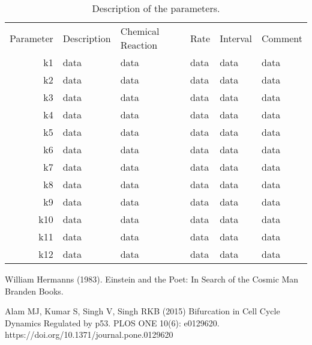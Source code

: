 \documentclass[preprint, 12pt]{elsarticle}
\theoremstyle{definition}
\begin{document}
 \begin{table}[H]
	\centering
	\begin{tabular}{rlllll}
		\hline
		Parameter & Description & Chemical Reaction & Rate & Interval &  Comment\\
		k1 & data & data & data & data & data \\
		k2 & data & data & data & data & data \\
		k3 & data & data & data & data & data \\
		k4 & data & data & data & data & data \\
		k5 & data & data & data & data & data \\
		k6 & data & data & data & data & data \\
		k7 & data & data & data & data & data \\
		k8 & data & data & data & data & data \\
		k9 & data & data & data & data & data \\
		k10 & data & data & data & data & data \\
		k11 & data & data & data & data & data \\
		k12 & data & data & data & data & data \\
		\hline
		\hline
	\end{tabular}
	\caption{Description of the parameters.}
	\label{tab:Table3}
\end{table}


\begin{thebibliography}{00}
		
 William Hermanns (1983). 
\newblock Einstein and the Poet: In Search of the Cosmic Man
\newblock Branden Books.

Alam MJ, Kumar S, Singh V, Singh RKB (2015) 
\newblock Bifurcation in Cell Cycle Dynamics Regulated by p53. 
\newblock PLOS ONE 10(6): e0129620. https://doi.org/10.1371/journal.pone.0129620
		
\end{thebibliography}
	
\end{document}
